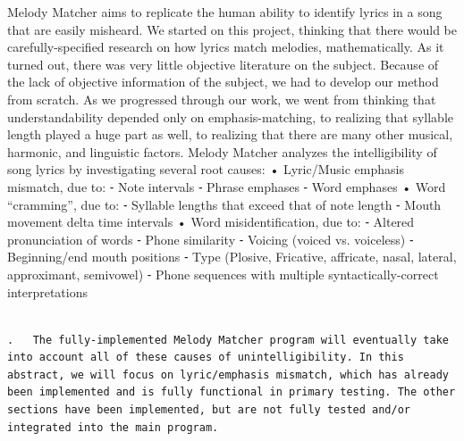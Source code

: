 \documentclass[10pt,oneside]{memoir}
\begin{document}
Melody Matcher aims to replicate the human ability to identify lyrics in a song that are easily misheard. We started on this project, thinking that there would be carefully-specified research on how lyrics match melodies, mathematically. As it turned out, there was very little objective literature on the subject. Because of the lack of objective information of the subject, we had to develop our method from scratch. As we progressed through our work, we went from thinking that understandability depended only on emphasis-matching, to realizing that syllable length played a huge part as well, to realizing that there are many other musical, harmonic, and linguistic factors.
Melody Matcher analyzes the intelligibility of song lyrics by investigating several root causes:
    •  Lyric/Music emphasis mismatch, due to: 
    ⁃ Note intervals
    ⁃  Phrase emphases
    ⁃ Word emphases
    • Word ``cramming'', due to:
    ⁃  Syllable lengths that exceed that of note length
    ⁃ Mouth movement delta time intervals
    • Word misidentification, due to:
    ⁃ Altered pronunciation of words
    ⁃  Phone similarity
    ⁃ Voicing (voiced vs. voiceless)
    ⁃ Beginning/end mouth positions
    ⁃ Type (Plosive, Fricative, affricate, nasal, lateral, approximant, semivowel)
    ⁃ Phone sequences with multiple syntactically-correct interpretations


\begin{adjustwidth}{2.5em}{2.5em}
\begin{verbatim}

.   The fully-implemented Melody Matcher program will eventually take into account all of these causes of unintelligibility. In this abstract, we will focus on lyric/emphasis mismatch, which has already been implemented and is fully functional in primary testing. The other sections have been implemented, but are not fully tested and/or integrated into the main program.

\end{verbatim}
\end{adjustwidth}
\end{document}
